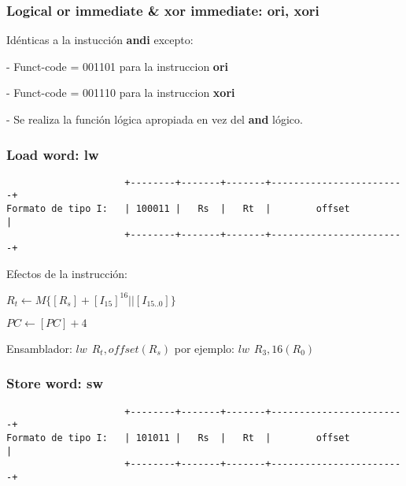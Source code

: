 \documentclass[letterpaper,11pt]{scrartcl}
\begin{document}

\subsubsection*{Logical or immediate \& xor immediate: \textbf{ori, xori}}

Idénticas a la instucción \textbf{andi} excepto:

- Funct-code = 001101 para la instruccion \textbf{ori}

- Funct-code = 001110 para la instruccion \textbf{xori}

- Se realiza la función lógica apropiada en vez del \textbf{and} lógico.


\subsubsection*{Load word: \textbf{lw}}

\begin{verbatim}
                     +--------+-------+-------+------------------------+ 
Formato de tipo I:   | 100011 |   Rs  |   Rt  |        offset          | 
                     +--------+-------+-------+------------------------+ 
\end{verbatim}

Efectos de la instrucción: 

$R_{t} \leftarrow M\{[R_{s}] + [I_{15}]^{16} || [I_{15..0}] \}$

$PC \leftarrow [PC] + 4$

Ensamblador: $lw\hspace{5pt}R_{t}, offset(R_{s})$ por ejemplo: $lw\hspace{5pt}R_{3}, 16(R_{0})$


\subsubsection*{Store word: \textbf{sw}}

\begin{verbatim}
                     +--------+-------+-------+------------------------+ 
Formato de tipo I:   | 101011 |   Rs  |   Rt  |        offset          | 
                     +--------+-------+-------+------------------------+ 
\end{verbatim}
\end{document}
